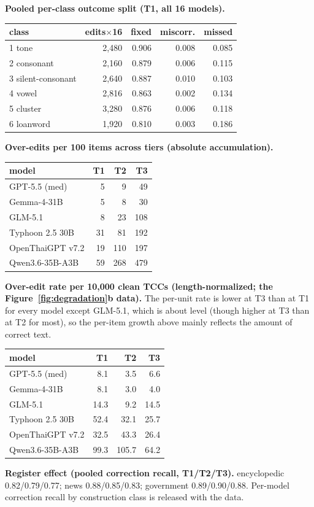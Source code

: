 \documentclass[11pt]{article}
\begin{document}
\textbf{Pooled per-class outcome split (T1, all 16 models).}
\begin{center}\small\setlength{\tabcolsep}{3pt}
\begin{tabular}{@{}lrrrr@{}}
\toprule
class & edits$\times$16 & fixed & miscorr. & missed \\
\midrule
1 tone     & 2{,}480 & 0.906 & 0.008 & 0.085 \\
2 consonant& 2{,}160 & 0.879 & 0.006 & 0.115 \\
3 silent-consonant & 2{,}640 & 0.887 & 0.010 & 0.103 \\
4 vowel    & 2{,}816 & 0.863 & 0.002 & 0.134 \\
5 cluster  & 3{,}280 & 0.876 & 0.006 & 0.118 \\
6 loanword & 1{,}920 & 0.810 & 0.003 & 0.186 \\
\bottomrule
\end{tabular}
\end{center}
\textbf{Over-edits per 100 items across tiers (absolute accumulation).}
\begin{center}\small
\begin{tabular}{@{}lrrr@{}}
\toprule
model & T1 & T2 & T3 \\
\midrule
GPT-5.5 (med)    & 5  & 9   & 49  \\
Gemma-4-31B      & 5  & 8   & 30  \\
GLM-5.1          & 8  & 23  & 108 \\
Typhoon 2.5 30B  & 31 & 81  & 192 \\
OpenThaiGPT v7.2   & 19 & 110 & 197 \\
Qwen3.6-35B-A3B  & 59 & 268 & 479 \\
\bottomrule
\end{tabular}
\end{center}
\textbf{Over-edit rate per 10{,}000 clean TCCs (length-normalized; the
Figure~\ref{fig:degradation}b data).} The per-unit rate is lower at T3 than at T1 for every
model except GLM-5.1, which is about level (though higher at T3 than at T2 for most), so the per-item growth above mainly reflects the
amount of correct text.
\begin{center}\small
\begin{tabular}{@{}lrrr@{}}
\toprule
model & T1 & T2 & T3 \\
\midrule
GPT-5.5 (med)    & 8.1   & 3.5   & 6.6  \\
Gemma-4-31B      & 8.1   & 3.0   & 4.0  \\
GLM-5.1          & 14.3  & 9.2   & 14.5 \\
Typhoon 2.5 30B  & 52.4  & 32.1  & 25.7 \\
OpenThaiGPT v7.2   & 32.5  & 43.3  & 26.4 \\
Qwen3.6-35B-A3B  & 99.3  & 105.7 & 64.2 \\
\bottomrule
\end{tabular}
\end{center}
\textbf{Register effect (pooled correction recall, T1/T2/T3).} encyclopedic 0.82/0.79/0.77;
news 0.88/0.85/0.83; government 0.89/0.90/0.88. Per-model correction recall by construction class is released with
the data.
\end{document}
